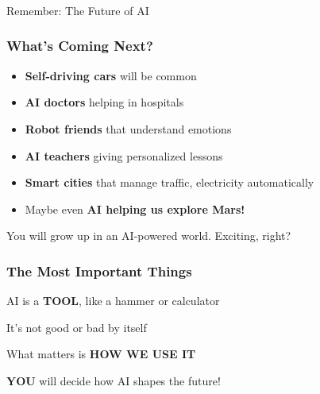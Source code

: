 \begin{frame}[fragile]\frametitle{}
\begin{center}
{\Large Remember: The Future of AI}
\end{center}
\end{frame}

\begin{frame}[fragile]\frametitle{What's Coming Next?}
\begin{itemize}
\item {\bf Self-driving cars} will be common
\item {\bf AI doctors} helping in hospitals
\item {\bf Robot friends} that understand emotions
\item {\bf AI teachers} giving personalized lessons
\item {\bf Smart cities} that manage traffic, electricity automatically
\item Maybe even {\bf AI helping us explore Mars!}
\end{itemize}

\vspace{0.5cm}
You will grow up in an AI-powered world. Exciting, right?
\end{frame}

\begin{frame}[fragile]\frametitle{The Most Important Things}

\begin{center}
\Large
AI is a {\bf TOOL}, like a hammer or calculator

\vspace{0.5cm}
It's not good or bad by itself

\vspace{0.5cm}
What matters is {\bf HOW WE USE IT}

\vspace{0.5cm}
{\bf YOU} will decide how AI shapes the future!
\end{center}

\end{frame}

